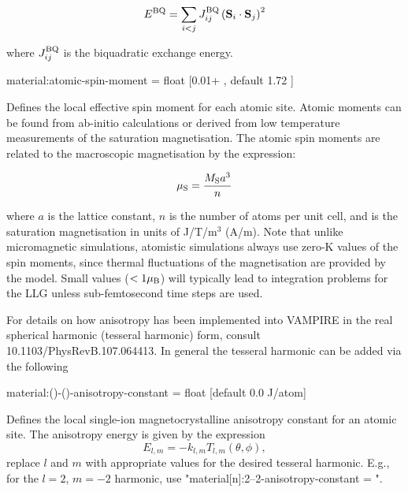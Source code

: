 \begin{equation*}
E^{\mathrm{BQ}} = \sum_{i<j} J_{ij}^{\mathrm{BQ}} \left( \mathbf{S}_i \cdot \mathbf{S}_j \right)^2
\end{equation*}

\noindent where $J_{ij}^{\mathrm{BQ}}$ is the biquadratic exchange energy.

{\zicf material:atomic-spin-moment = float [0.01+ \muB, default 1.72 \muB]} Defines the local effective spin moment for each atomic site. Atomic moments can be found from ab-initio calculations or derived from low temperature measurements of the saturation magnetisation. The atomic spin moments are related to the macroscopic magnetisation by the expression:

\begin{equation*}
\mu_\mathrm{S} = \frac{M_\mathrm{S} a^3}{n}
\end{equation*}

\noindent where $a$ is the lattice constant, $n$ is the number of atoms per unit cell, and \Ms is the saturation magnetisation in units of J/T/m$^3$ (A/m). Note that unlike micromagnetic simulations, atomistic simulations always use zero-K values of the spin moments, since thermal fluctuations of the magnetisation are provided by the model. Small values ($<1 \mu_\mathrm{B}$) will typically lead to integration problems for the LLG unless sub-femtosecond time steps are used.

\noindent For details on how anisotropy has been implemented into VAMPIRE in the real spherical harmonic (tesseral harmonic) form, consult 10.1103/PhysRevB.107.064413.
\noindent In general the tesseral harmonic can be added via the following

{\zicf material:()-()-anisotropy-constant = float [default 0.0 J/atom]} Defines the local single-ion magnetocrystalline anisotropy constant for an atomic site. The anisotropy energy is given by the expression
\begin{equation*}
  E_{l,m} = -k_{l,m}T_{l,m}(\theta, \phi),
\end{equation*}
replace $l$ and $m$ with appropriate values for the desired tesseral harmonic.
E.g., for the $ l = 2 $, $ m = -2 $ harmonic, use "material[n]:2--2-anisotropy-constant = ".


